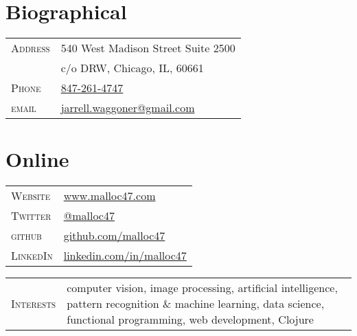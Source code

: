 \documentclass[10pt]{article}
\begin{document}
\pagestyle{empty}

\par{\bigskip\par}

\begin{multicols}{2}
\setlength{\parskip}{0pt}
\section{Biographical}

\begin{tabularx}{\linewidth}{@{}l X@{}}
  \textsc{Address} & \small{540 West Madison Street Suite 2500} \\
                   & \small{c/o DRW, Chicago, IL, 60661} \\
  \textsc{Phone}   & \href{http://www.malloc47.com/call-me/}{847-261-4747}\\
  \textsc{email}   & \href{mailto:jarrell.waggoner@gmail.com}{jarrell.waggoner@gmail.com} \\
\end{tabularx}

\vfill
\columnbreak

\section{Online}
\begin{tabularx}{\linewidth}{@{}l X@{}}
  \textsc{Website}	& \href{http://www.malloc47.com}{www.malloc47.com} \\
  \textsc{Twitter}     & \href{https://twitter.com/malloc47}{@malloc47} \\
  \textsc{github}      & \href{http://www.github.com/malloc47}{github.com/malloc47}\\
  \textsc{LinkedIn}    & \href{http://www.linkedin.com/in/malloc47}{linkedin.com/in/malloc47} \\
\end{tabularx}

\end{multicols}

\begin{tabularx}{\textwidth}{@{}l X}
  \textsc{Interests} & computer vision, image processing, artificial
  intelligence, pattern recognition \& machine learning, data science,
  functional programming, web development, Clojure
\end{tabularx}

\newcommand{\degree}[4]{\textsc{#1} & \textbf{#2} & \textsc{#3} & \textbf{#4}\\}
\end{document}
